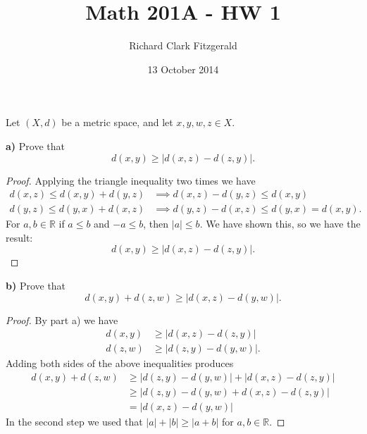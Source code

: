 \documentclass[12pt]{article}
\title{Math 201A - HW 1}
\date{13 October 2014}
\author{Richard Clark Fitzgerald}
\begin{document}
\maketitle

\section{}

Let $(X, d)$ be a metric space, and let $x, y, w, z \in X$.

\textbf{a)}
Prove that
\[
    d(x, y) \geq |d(x, z) - d(z, y)|.
\]

\begin{proof}

Applying the triangle inequality two times we have
\begin{align*}
    d(x, z) \leq d(x, y) + d(y, z) 
    &\implies 
    d(x, z) - d(y, z) \leq d(x, y) \\
    d(y, z) \leq d(y, x) + d(x, z)
    &\implies 
    d(y, z) - d(x, z) \leq d(y, x) = d(x, y).
\end{align*}
For $a, b \in \mathbb{R}$ if $a \leq b$ and $-a \leq b$, then
$|a| \leq b$. We have shown this, so we have the result:
\[
    d(x, y) \geq |d(x, z) - d(z, y)|.
\]

\end{proof}

\textbf{b)}
Prove that
\[
    d(x, y) + d(z, w) \geq |d(x, z) - d(y, w)|.
\]

\begin{proof}

By part a) we have
\begin{align*}
   d(x, y) &\geq |d(x, z) - d(z, y)| \\
   d(z, w) &\geq |d(z, y) - d(y, w)|.
\end{align*}
Adding both sides of the above inequalities produces
\begin{align*}
   d(x, y) + d(z, w) &\geq |d(z, y) - d(y, w)| + |d(x, z) - d(z, y)| \\
                     &\geq |d(z, y) - d(y, w) + d(x, z) - d(z, y)|  \\
                     &= |d(x, z) - d(y, w)|
\end{align*}
In the second step we used that $|a| + |b| \geq |a + b|$ for $a, b \in \mathbb{R}$.
\end{proof}
\end{document}
